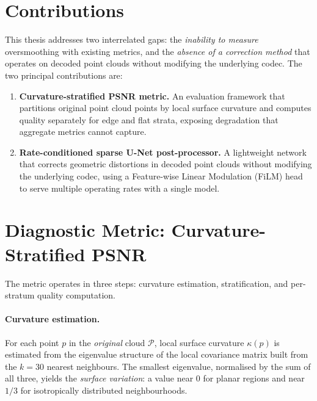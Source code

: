 \section*{Contributions}

This thesis addresses two interrelated gaps: the \emph{inability to measure}
oversmoothing with existing metrics, and the \emph{absence of a correction method}
that operates on decoded point clouds without modifying the underlying codec.
The two principal contributions are:

\begin{enumerate}
  \item \textbf{Curvature-stratified PSNR metric.}
    An evaluation framework that partitions original point cloud points by local
    surface curvature and computes quality separately for edge and flat strata,
    exposing degradation that aggregate metrics cannot capture.

  \item \textbf{Rate-conditioned sparse U-Net post-processor.}
    A lightweight network that corrects geometric distortions in decoded point
    clouds without modifying the underlying codec, using a Feature-wise Linear
    Modulation (FiLM) head~\cite{perez2018film} to serve multiple operating
    rates with a single model.
\end{enumerate}

\section*{Diagnostic Metric: Curvature-Stratified PSNR}

The metric operates in three steps: curvature estimation, stratification, and
per-stratum quality computation.

\paragraph{Curvature estimation.}
For each point $p$ in the \emph{original} cloud $\mathcal{P}$, local surface
curvature $\kappa(p)$ is estimated from the eigenvalue structure of the local
covariance matrix built from the $k=30$ nearest neighbours.
The smallest eigenvalue, normalised by the sum of all three, yields the
\emph{surface variation}: a value near 0 for planar regions and near $1/3$
for isotropically distributed neighbourhoods.

